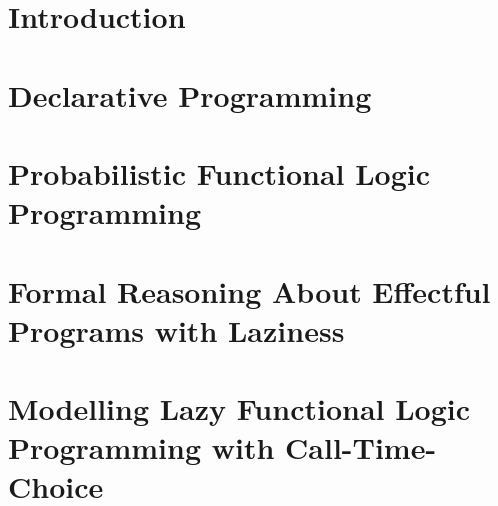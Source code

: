 \documentclass[%
    paper=A4,               %
    twoside=true,           %
    openright,              %
    parskip=false,           %
    chapterprefix=true,     %
    11pt,                   %
    headings=normal,        %
    bibliography=totoc,     %
    listof=totoc,           %
    titlepage=on,           %
    captions=tableabove,    %
    draft=false,            %
]{scrbook}%
\begin{document}

\pagestyle{empty}				%

\cleardoublepage

\pagestyle{plain}				%

\cleardoublepage
%

\cleardoublepage
%
\setcounter{tocdepth}{2}		%
\tableofcontents				%
\cleardoublepage

\setcounter{page}{1}			%
\pagestyle{maincontentstyle} 	%

\chapter{Introduction}
\label{ch:intro}


\chapter{Declarative Programming}
\label{ch:dp}
%

\chapter{Probabilistic Functional Logic Programming}
\label{ch:pflp}
%

\chapter{Formal Reasoning About Effectful Programs with Laziness}
\label{ch:reasoning} 
%

\chapter{Modelling Lazy Functional Logic Programming with Call-Time-Choice}
\label{ch:modelling} 
%
\end{document}
